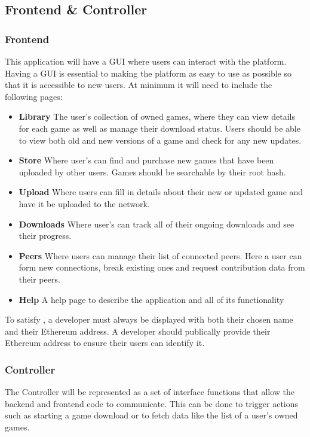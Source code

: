 \subsection{Frontend \& Controller}

\subsubsection{Frontend}\label{subsubsec:frontend}

This application will have a GUI   where users can interact with the platform. Having a GUI is essential to making the platform as easy to use as possible so that it is accessible to new users. At minimum it will need to include the following pages:

\begin{itemize}
  \item \textbf{Library} The user's collection of owned games, where they can view details for each game as well as manage their download status. Users should be able to view both old and new versions of a game and check for any new updates.
  \item \textbf{Store} Where user's can find and purchase new games that have been uploaded by other users. Games should be searchable by their root hash.
  \item \textbf{Upload} Where users can fill in details about their new or updated game and have it be uploaded to the network.
  \item \textbf{Downloads} Where user's can track all of their ongoing downloads and see their progress.
  \item \textbf{Peers} Where users can manage their list of connected peers. Here a user can form new connections, break existing ones and request contribution data from their peers.
  \item \textbf{Help} A help page to describe the application and all of its functionality 
\end{itemize}

\newparagraph
To satisfy , a developer must always be displayed with both their chosen name and their Ethereum address. A developer should publically provide their Ethereum address to ensure their users can identify it.

\subsubsection{Controller}

The Controller will be represented as a set of interface functions that allow the backend and frontend code to communicate. This can be done to trigger actions such as starting a game download or to fetch data like the list of a user's owned games.
